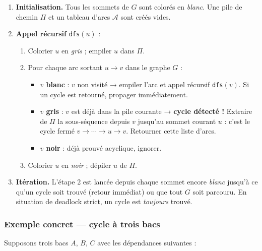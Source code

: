 \documentclass[12pt,a4paper]{article}
\begin{document}
\begin{enumerate}
  \item \textbf{Initialisation.} Tous les sommets de $G$ sont colorés en
        \emph{blanc}. Une pile de chemin $\Pi$ et un tableau d'arcs
        $\mathcal{A}$ sont créés vides.

  \item \textbf{Appel récursif} \texttt{dfs}$(u)$ :
        \begin{enumerate}[label=\alph*.]
          \item Colorier $u$ en \emph{gris} ; empiler $u$ dans $\Pi$.
          \item Pour chaque arc sortant $u \to v$ dans le graphe $G$ :
                \begin{itemize}[noitemsep]
                  \item \textbf{$v$ blanc} : $v$ non visité → empiler l'arc et
                        appel récursif \texttt{dfs}$(v)$. Si un cycle est
                        retourné, propager immédiatement.
                  \item \textbf{$v$ gris} : $v$ est déjà dans la pile courante
                        → \textbf{cycle détecté !} Extraire de $\Pi$ la
                        sous-séquence depuis $v$ jusqu'au sommet courant $u$ :
                        c'est le cycle fermé $v \to \cdots \to u \to v$.
                        Retourner cette liste d'arcs.
                  \item \textbf{$v$ noir} : déjà prouvé acyclique, ignorer.
                \end{itemize}
          \item Colorier $u$ en \emph{noir} ; dépiler $u$ de $\Pi$.
        \end{enumerate}

  \item \textbf{Itération.} L'étape 2 est lancée depuis chaque sommet
        encore \emph{blanc} jusqu'à ce qu'un cycle soit trouvé (retour
        immédiat) ou que tout $G$ soit parcouru. En situation de deadlock
        strict, un cycle est \emph{toujours} trouvé.
\end{enumerate}

\subsubsection{Exemple concret — cycle à trois bacs}

Supposons trois bacs $A$, $B$, $C$ avec les dépendances suivantes :
\end{document}
